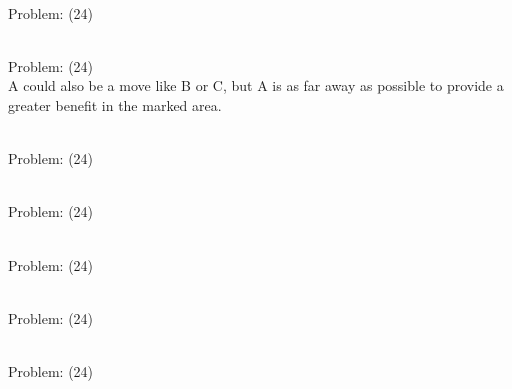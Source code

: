 \documentclass[11pt]{article}
\begin{document}
\begin{minipage}[t]{0.5\textwidth}
  {\centering
  
\\
Problem: (24)\\
  }
\end{minipage}
\begin{minipage}[t]{0.5\textwidth}
  {\centering
  
\\
Problem: (24)\\
A could also be a move like B or C, but A is as far away as possible to provide a greater benefit in the marked area.\\
  }
\end{minipage}
\begin{minipage}[t]{0.5\textwidth}
  {\centering
  
\\
Problem: (24)\\
  }
\end{minipage}
\begin{minipage}[t]{0.5\textwidth}
  {\centering
  
\\
Problem: (24)\\
  }
\end{minipage}
\begin{minipage}[t]{0.5\textwidth}
  {\centering
  
\\
Problem: (24)\\
  }
\end{minipage}
\begin{minipage}[t]{0.5\textwidth}
  {\centering
  
\\
Problem: (24)\\
  }
\end{minipage}
\begin{minipage}[t]{0.5\textwidth}
  {\centering
  
\\
Problem: (24)\\
  }
\end{minipage}
\end{document}
